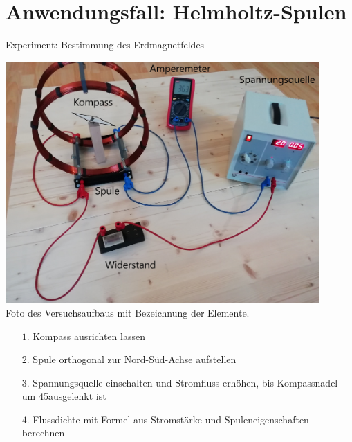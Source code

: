 \part{Anwendungsfall: Helmholtz-Spulen}
\label{part:physics}
\begin{frame}[fragile]{Experiment: Bestimmung des Erdmagnetfeldes}
\begin{minipage}{0.45\textwidth}
	\centering
	\includegraphics[width=0.9\textwidth]{images/papers/setup_labled.jpg}\\
	\small Foto des Versuchsaufbaus mit Bezeichnung der Elemente.
\end{minipage}
\pause
\begin{minipage}{0.5\textwidth}
	{
		\begin{itemize}[itemsep=1mm]
			\item[$1.$] Kompass ausrichten lassen
			\item[$2.$] Spule orthogonal zur Nord-Süd-Achse aufstellen
			\item[$3.$] Spannungsquelle einschalten und Stromfluss erhöhen, bis Kompassnadel um 45\degree ausgelenkt ist
			\item[$4.$] Flussdichte mit Formel aus Stromstärke und Spuleneigenschaften berechnen
		\end{itemize}
	}
\end{minipage}
\end{frame}

